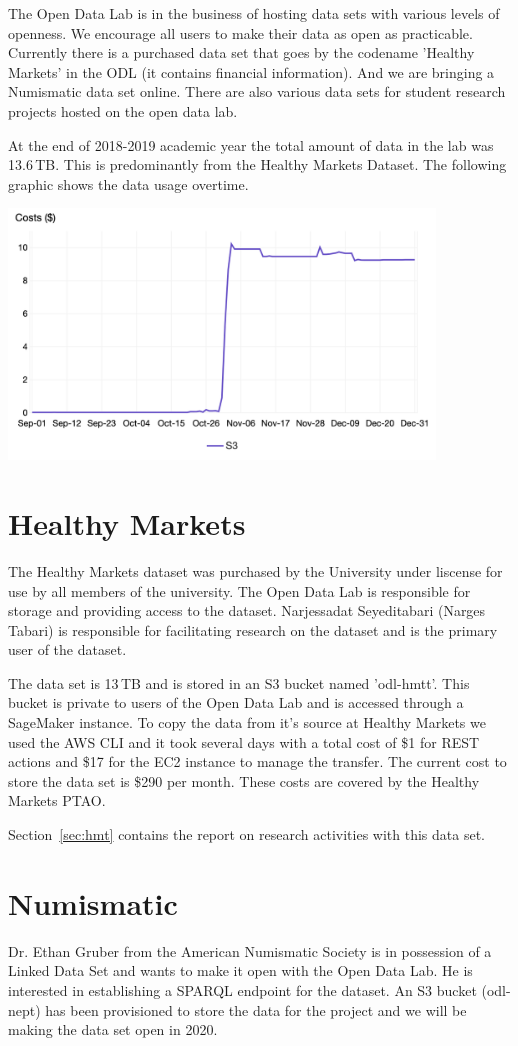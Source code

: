 The Open Data Lab is in the business of hosting data sets with various levels of openness. We encourage all users to make their data as open as practicable. Currently there is a purchased data set that goes by the codename 'Healthy Markets' in the ODL (it contains financial information). And we are bringing a Numismatic data set online. There are also various data sets for student research  projects hosted on the open data lab.

At the end of 2018-2019 academic year the total amount of data in the lab was  13.6\,TB. This is predominantly from the Healthy Markets Dataset. The following graphic shows the data usage overtime.

\bigskip

\includegraphics[width=0.85\textwidth]{images/odl-s3-usage-2018.png}


\section{Healthy Markets}
The Healthy Markets dataset was purchased by the University under liscense for use by  all members of the university. The Open Data Lab is responsible for storage and providing access to the dataset. Narjessadat Seyeditabari (Narges Tabari) is responsible for facilitating research on the dataset and is the primary user of the dataset.

The data set is 13\,TB and is stored in an S3 bucket named 'odl-hmtt'. This bucket is private to users of the Open Data Lab and is accessed through a SageMaker instance. To copy the data from it's source at Healthy Markets we used the AWS CLI and it took several days with a total cost of \$1 for REST actions and \$17 for the EC2 instance to manage the transfer. The current cost to store the data set is \$290 per month. These costs are covered by the Healthy Markets PTAO.

Section~\ref{sec:hmt} contains the report on research activities with this data set.

\section{Numismatic}
Dr. Ethan Gruber from the American Numismatic Society is in possession of a Linked Data Set  and wants to make it open with the Open Data Lab. He is interested in establishing a SPARQL endpoint for the  dataset. An S3 bucket (odl-nept) has been provisioned to store the data for the project and we will be making the data set open in 2020.